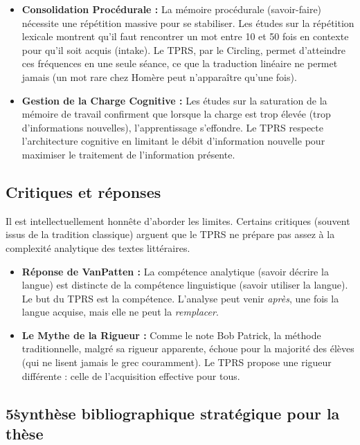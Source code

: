 \begin{itemize}\item \textbf{Consolidation Procédurale :} La mémoire procédurale (savoir-faire) nécessite une répétition massive pour se stabiliser. Les études sur la répétition lexicale montrent qu'il faut rencontrer un mot entre 10 et 50 fois en contexte pour qu'il soit acquis (intake). Le TPRS, par le Circling, permet d'atteindre ces fréquences en une seule séance, ce que la traduction linéaire ne permet jamais (un mot rare chez Homère peut n'apparaître qu'une fois).\cite{III-2-3-ref8}\item \textbf{Gestion de la Charge Cognitive :} Les études sur la saturation de la mémoire de travail confirment que lorsque la charge est trop élevée (trop d'informations nouvelles), l'apprentissage s'effondre. Le TPRS respecte l'architecture cognitive en limitant le débit d'information nouvelle pour maximiser le traitement de l'information présente.\cite{III-2-3-ref10}\end{itemize}

\subsection{Critiques et réponses}

Il est intellectuellement honnête d'aborder les limites. Certains critiques (souvent issus de la
tradition classique) arguent que le TPRS ne prépare pas assez à la complexité analytique des textes
littéraires.

\begin{itemize}\item \textbf{Réponse de VanPatten :} La compétence analytique (savoir décrire la langue) est distincte de la compétence linguistique (savoir utiliser la langue). Le but du TPRS est la compétence. L'analyse peut venir \textit{après}, une fois la langue acquise, mais elle ne peut la \textit{remplacer}.\cite{III-2-3-ref3}\item \textbf{Le Mythe de la Rigueur :} Comme le note Bob Patrick, la méthode traditionnelle, malgré sa \og rigueur\fg{} apparente, échoue pour la majorité des élèves (qui ne lisent jamais le grec couramment). Le TPRS propose une rigueur différente : celle de l'acquisition effective pour tous.\cite{III-2-3-ref27}\end{itemize}

\subsection{5\. synthèse bibliographique stratégique pour la thèse}

